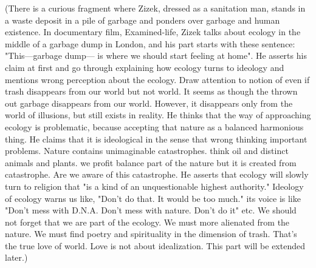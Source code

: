 (There is a curious fragment where Zizek, dressed as a sanitation man, stands in a waste deposit in a pile of garbage and ponders over garbage and human existence. In documentary film, Examined-life, Zizek talks about ecology in the middle of a garbage dump in London, and his part starts with these sentence: "This---garbage dump--- is where we should start feeling at home". He asserts his claim at first and go through explaining how ecology turns to ideology and mentions wrong perception about the ecology. Draw attention to notion of even if trash disappears from our world but not world. It seems as though the thrown out garbage disappears from our world. However, it disappears only from the world of illusions, but still exists in reality. He thinks that the way of approaching ecology is problematic, because accepting that nature as a balanced harmonious thing. He claims that it is ideological in the sense that wrong thinking important problems. Nature contains unimaginable catastrophes. think oil and distinct animals and plants. we profit balance part of the nature but it is created from catastrophe. Are we aware of this catastrophe. He asserts that ecology will slowly turn to religion that "is a kind of an unquestionable highest authority." Ideology of ecology warns us like, "Don't do that. It would be too much." its voice is like "Don't mess with D.N.A. Don't mess with nature. Don't do it" etc. We should not forget that we are part of the ecology. We must more alienated from the nature. We must find poetry and spirituality in the dimension of trash. That's the true love of world. Love is not about idealization. This part will be extended later.)

 \cite{vafin2012zizek}

